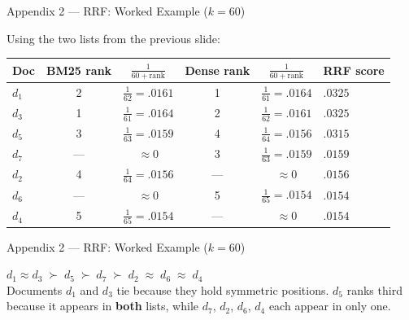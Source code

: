 \documentclass[aspectratio=169]{beamer}
\begin{document}
\begin{frame}{Appendix 2 --- RRF: Worked Example ($k=60$)}

Using the two lists from the previous slide:

\bigskip

\begin{center}
\renewcommand{\arraystretch}{1.3}
\begin{tabular}{l c c c c l}
\hline
\textbf{Doc}
  & \textbf{BM25 rank}
  & $\frac{1}{60+\text{rank}}$
  & \textbf{Dense rank}
  & $\frac{1}{60+\text{rank}}$
  & \textbf{RRF score} \\
\hline
$d_1$ & 2 & $\frac{1}{62} = .0161$
      & 1 & $\frac{1}{61} = .0164$
      & $\mathbf{.0325}$ \\[3pt]
$d_3$ & 1 & $\frac{1}{61} = .0164$
      & 2 & $\frac{1}{62} = .0161$
      & $\mathbf{.0325}$ \\[3pt]
$d_5$ & 3 & $\frac{1}{63} = .0159$
      & 4 & $\frac{1}{64} = .0156$
      & $.0315$ \\[3pt]
$d_7$ & --- & $\approx 0$
      & 3 & $\frac{1}{63} = .0159$
      & $.0159$ \\[3pt]
$d_2$ & 4 & $\frac{1}{64} = .0156$
      & --- & $\approx 0$
      & $.0156$ \\[3pt]
$d_6$ & --- & $\approx 0$
      & 5 & $\frac{1}{65} = .0154$
      & $.0154$ \\[3pt]
$d_4$ & 5 & $\frac{1}{65} = .0154$
      & --- & $\approx 0$
      & $.0154$ \\
\hline
\end{tabular}
\end{center}
\end{frame}
%
%
\begin{frame}{Appendix 2 --- RRF: Worked Example ($k=60$)}
\begin{tcolorbox}[colback=green!5!white, colframe=green!60!black,
  title=\textbf{Fused ranking}]
$d_1 \approx d_3 \;\succ\; d_5 \;\succ\; d_7 \;\succ\; d_2
\;\approx\; d_6 \;\approx\; d_4$\\[4pt]
Documents $d_1$ and $d_3$ tie because they hold symmetric positions.
$d_5$ ranks third because it appears in \textbf{both} lists,
while $d_7$, $d_2$, $d_6$, $d_4$ each appear in only one.
\end{tcolorbox}

\end{frame}
%
%
\end{document}
